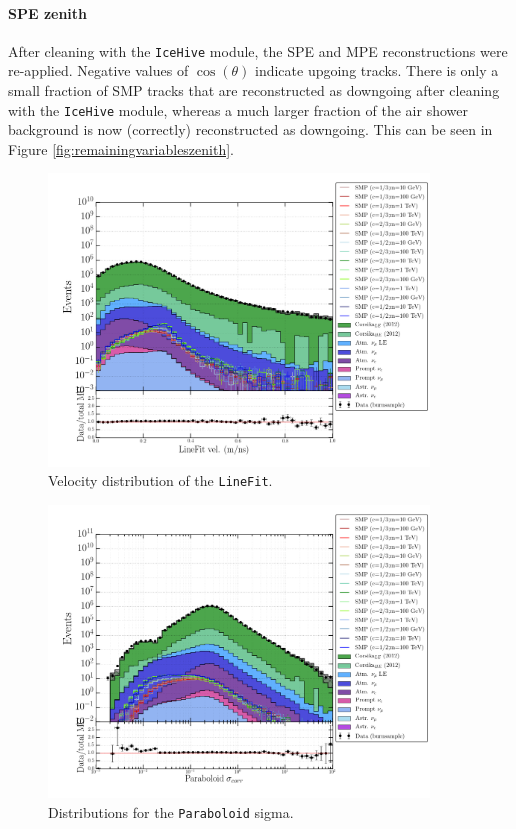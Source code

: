 \paragraph{SPE zenith}
After cleaning with the \texttt{IceHive} module, the SPE and MPE reconstructions were re-applied. Negative values of $\cos\left(\theta\right)$ indicate upgoing tracks. There is only a small fraction of SMP tracks that are reconstructed as downgoing after cleaning with the \texttt{IceHive} module, whereas a much larger fraction of the air shower background is now (correctly) reconstructed as downgoing. This can be seen in Figure \ref{fig:remainingvariableszenith}.

\begin{figure}
\centering
\includegraphics[width=0.9\textwidth]{chapter8/img/1D_stack_linefitvelocity}
\caption{Velocity distribution of the \texttt{LineFit}.}
\label{fig:remainingvariableslf}
\end{figure}


\begin{figure}
\centering
\includegraphics[width=0.9\textwidth]{chapter8/img/1D_stack_sigma_corr_paraboloid}
\caption{Distributions for the \texttt{Paraboloid} sigma.}
\label{fig:remainingvariablespara}
\end{figure}


